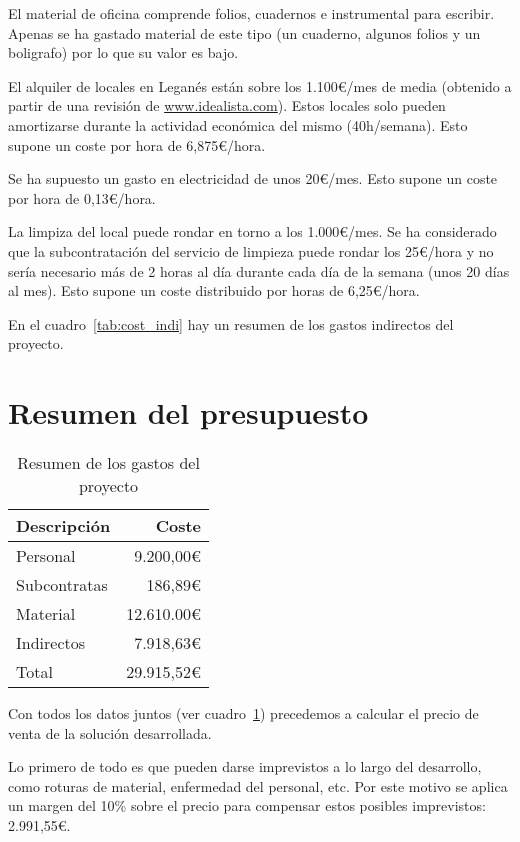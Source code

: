 El material de oficina comprende folios, cuadernos e instrumental para escribir. Apenas se ha gastado material de este tipo (un cuaderno, algunos folios y un boligrafo) por lo que su valor es bajo.

El alquiler de locales en Leganés están sobre los 1.100\euro/mes de media (obtenido a partir de una revisión de \url{www.idealista.com}). Estos locales solo pueden amortizarse durante la actividad económica del mismo (40h/semana). Esto supone un coste por hora de 6,875\euro/hora.

Se ha supuesto un gasto en electricidad de unos 20\euro/mes. Esto supone un coste por hora de 0,13\euro/hora.

La limpiza del local puede rondar en torno a los 1.000\euro/mes. Se ha considerado que la subcontratación del servicio de limpieza puede rondar los 25\euro/hora y no sería necesario más de 2 horas al día durante cada día de la semana (unos 20 días al mes). Esto supone un coste distribuido por horas de 6,25\euro/hora.

En el cuadro~\ref{tab:cost_indi} hay un resumen de los gastos indirectos del proyecto.

\section{Resumen del presupuesto}

\begin{table}
	\centering
	
	\begin{tabular}{|l|r|}
		\hline
		Descripción        & Coste  \\
		\hline
		Personal & 9.200,00\euro \\
		\hline
		Subcontratas        & 186,89\euro \\
		\hline
		Material     & 12.610.00\euro\\
		\hline
		Indirectos & 7.918,63\euro\\
		\hline
		\hline
		Total              & 29.915,52\euro\\
		\hline
	\end{tabular}
	\caption{Resumen de los gastos del proyecto}\label{tab:resu_gastos}
\end{table}

Con todos los datos juntos (ver cuadro~\ref{tab:resu_gastos}) precedemos a calcular el precio de venta de la solución desarrollada.

Lo primero de todo es que pueden darse imprevistos a lo largo del desarrollo, como roturas de material, enfermedad del personal, etc. Por este motivo se aplica un margen del 10\% sobre el precio para compensar estos posibles imprevistos: 2.991,55\euro.

